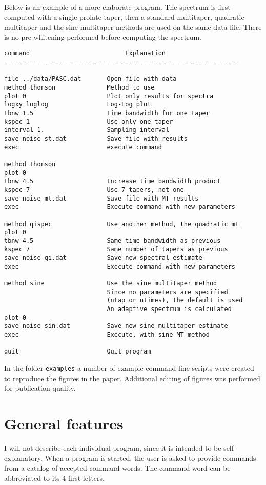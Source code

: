 \documentclass{article}
\begin{document}
Below is an example of a more elaborate program. The spectrum is first computed with a single prolate taper, then a standard multitaper, quadratic multitaper and the sine multitaper methods are used on the same data file. There is no pre-whitening performed before computing the spectrum. 
\begin{verbatim}
command                          Explanation
----------------------------------------------------------------

file ../data/PASC.dat       Open file with data
method thomson              Method to use
plot 0                      Plot only results for spectra
logxy loglog                Log-Log plot
tbnw 1.5                    Time bandwidth for one taper
kspec 1                     Use only one taper
interval 1.                 Sampling interval
save noise_st.dat           Save file with results
exec                        execute command 
 
method thomson
plot 0
tbnw 4.5                    Increase time bandwidth product
kspec 7                     Use 7 tapers, not one
save noise_mt.dat           Save file with MT results
exec                        Execute command with new parameters
 
method qispec               Use another method, the quadratic mt
plot 0
tbnw 4.5                    Same time-bandwidth as previous
kspec 7                     Same number of tapers as previous
save noise_qi.dat           Save new spectral estimate
exec                        Execute command with new parameters
 
method sine                 Use the sine multitaper method
                            Since no parameters are specified 
                            (ntap or ntimes), the default is used
                            An adaptive spectrum is calculated
plot 0
save noise_sin.dat          Save new sine multitaper estimate
exec                        Execute, with sine MT method
 
quit                        Quit program
\end{verbatim}

In the folder \texttt{examples} a number of example command-line scripts were created to reproduce the figures in the paper. Additional editing of figures was performed for publication quality. 

\section{General features}
I will not describe each individual program, since it is intended to be self-explanatory. When a program is started, the user is asked to provide commands from a catalog of accepted command words. The command word can be abbreviated to its 4 first letters. 
\end{document}

